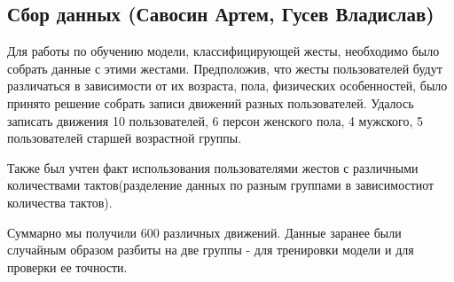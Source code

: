 \subsection{Сбор данных (Савосин Артем, Гусев Владислав)}
Для работы по обучению модели, классифицирующей жесты, необходимо было собрать данные с этими жестами. Предположив, что жесты пользователей будут различаться в зависимости от их возраста, пола, физических особенностей, было принято решение собрать записи движений разных пользователей. Удалось записать движения 10 пользователей, 6 персон женского пола, 4 мужского, 5 пользователей старшей возрастной группы.

Также был учтен факт использования пользователями жестов с различными количествами тактов(разделение данных по разным группами в зависимостиот количества тактов).

Суммарно мы получили 600 различных движений.
Данные заранее были случайным образом разбиты на две группы - для тренировки модели и для проверки ее точности.

\begin{figure}[H]
\end{figure}
